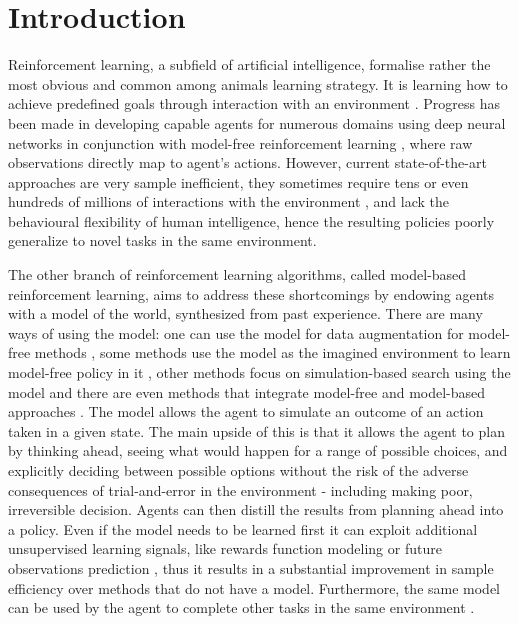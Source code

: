 \section{Introduction}

Reinforcement learning, a subfield of artificial intelligence, formalise rather the most obvious and common among animals learning strategy. It is learning how to achieve predefined goals through interaction with an environment \cite{Book.RLAI}. Progress has been made in developing capable agents for numerous domains using deep neural networks in conjunction with model-free reinforcement learning \cite{Algo.Rainbow}\cite{Algo.A3C}\cite{Algo.PPO}, where raw observations directly map to agent's actions. However, current state-of-the-art approaches are very sample inefficient, they sometimes require tens or even hundreds of millions of interactions with the environment \cite{Algo.Rainbow}, and lack the behavioural flexibility of human intelligence, hence the resulting policies poorly generalize to novel tasks in the same environment.

The other branch of reinforcement learning algorithms, called model-based reinforcement learning, aims to address these shortcomings by endowing agents with a model of the world, synthesized from past experience. There are many ways of using the model: one can use the model for data augmentation for model-free methods \cite{Algo.MBVE}, some methods use the model as the imagined environment to learn model-free policy in it \cite{Algo.WorldModels}, other methods focus on simulation-based search using the model \cite{Algo.AlphaZero} and there are even methods that integrate model-free and model-based approaches \cite{Algo.I2A}. The model allows the agent to simulate an outcome of an action taken in a given state. The main upside of this is that it allows the agent to plan by thinking ahead, seeing what would happen for a range of possible choices, and explicitly deciding between possible options without the risk of the adverse consequences of trial-and-error in the environment - including making poor, irreversible decision. Agents can then distill the results from planning ahead into a policy. Even if the model needs to be learned first it can exploit additional unsupervised learning signals, like rewards function modeling or future observations prediction \cite{Algo.AuxiliaryTasks}, thus it results in a substantial improvement in sample efficiency over methods that do not have a model. Furthermore, the same model can be used by the agent to complete other tasks in the same environment \cite{Algo.I2A}.

